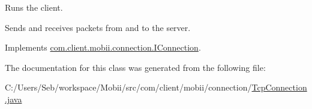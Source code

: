 Runs the client. 

Sends and receives packets from and to the server. 

Implements \hyperlink{interfacecom_1_1client_1_1mobii_1_1connection_1_1_i_connection}{com.\-client.\-mobii.\-connection.\-I\-Connection}.



The documentation for this class was generated from the following file\-:\begin{DoxyCompactItemize}
\item 
C\-:/\-Users/\-Seb/workspace/\-Mobii/src/com/client/mobii/connection/\hyperlink{_tcp_connection_8java}{Tcp\-Connection.\-java}\end{DoxyCompactItemize}
